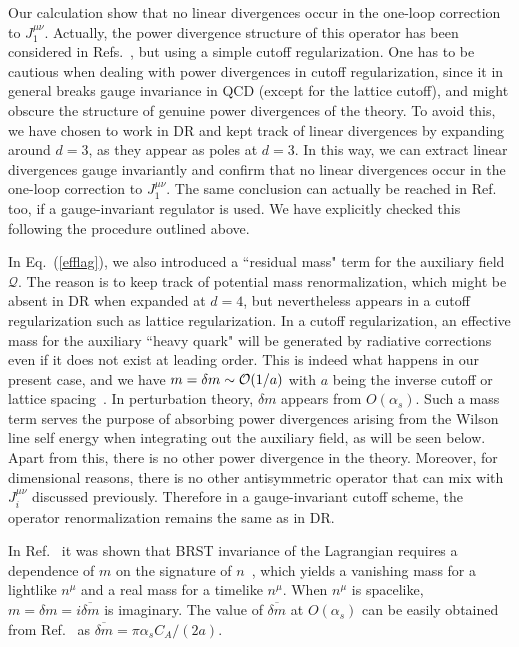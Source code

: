 Our calculation show that no linear divergences occur in the one-loop correction to $J_1^{\mu\nu}$. Actually, the power divergence structure of this operator has been considered in Refs.~\cite{Wang:2017qyg,Wang:2017eel}, but using a simple cutoff regularization. One has to be cautious when dealing with power divergences in cutoff regularization, since it in general breaks gauge invariance in QCD (except for the lattice cutoff), and might obscure the structure of genuine power divergences of the theory. To avoid this, we have chosen to work in DR and kept track of linear divergences by expanding around $d=3$, as they appear as poles at $d=3$. In this way, we can extract linear divergences gauge invariantly and confirm that no linear divergences occur in the one-loop correction to $J_1^{\mu\nu}$. The same conclusion can actually be reached in Ref.~\cite{Wang:2017eel} too, if a gauge-invariant regulator is used. We have explicitly checked this following the procedure outlined above.

In Eq.~(\ref{efflag}), we also introduced a ``residual mass" term for the auxiliary field $\mathcal Q$. The reason is to keep track of potential mass renormalization, which might be absent in DR when expanded at $d=4$, but nevertheless appears in a cutoff regularization such as lattice regularization. In a cutoff regularization, an effective mass for the auxiliary ``heavy quark" will be generated by radiative corrections even if it does not exist at leading order.
This is indeed what happens in our present case, and we have $m=\delta m\sim{\cal O}(1/a)$ with $a$ being the inverse cutoff or lattice spacing~\cite{Maiani:1991az}. In perturbation theory, $\delta m$ appears from $O(\alpha_s)$.
Such a mass term serves the purpose of absorbing power divergences arising from the Wilson line self energy when integrating out the auxiliary field, as will be seen below. Apart from this, there is no other power divergence in the theory. Moreover, for dimensional reasons, there is no other antisymmetric operator that can mix with $J_i^{\mu\nu}$ discussed previously. Therefore in a gauge-invariant cutoff scheme, the operator renormalization remains the same as in DR.

In Ref.~\cite{Ji:2017oey} it was shown that BRST invariance of the Lagrangian requires a dependence of $m$ on the signature of $n$~\cite{Dorn:1986dt}, which yields a vanishing mass for a lightlike $n^\mu$ and a real mass for a timelike $n^\mu$. When $n^\mu$ is spacelike, $m=\delta m=i\overline{\delta { m}}$ is imaginary. The value of $\overline{\delta { m}}$ at $O(\alpha_s)$ can be easily obtained from Ref.~\cite{Ji:2017oey} as $\overline{\delta { m}}={\pi\alpha_s C_A}/(2a)$.
